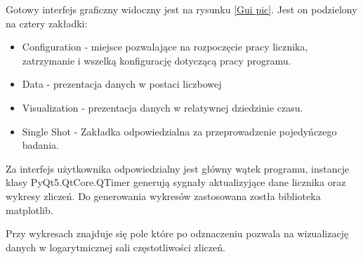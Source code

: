 \documentclass[a4paper,12pt]{article}
\begin{document}
Gotowy interfejs graficzny widoczny jest na rysunku \ref{Gui pic}. Jest on podzielony na cztery zakładki:
\begin{itemize}
        \item Configuration - miejsce pozwalające na rozpoczęcie pracy licznika, zatrzymanie i wszelką konfigurację dotyczącą pracy programu. 
        \item Data - prezentacja danych w postaci liczbowej 
        \item Visualization - prezentacja danych w relatywnej dziedzinie czasu. 
        \item Single Shot - Zakładka odpowiedzialna za przeprowadzenie pojedyńczego badania.
\end{itemize}

Za interfejs użytkownika odpowiedzialny jest główny wątek programu, instancje klasy PyQt5.QtCore.QTimer\cite{doc pyqt} generują sygnały aktualizyjące dane licznika oraz wykresy zliczeń. 
Do generowania wykresów zastosowana zostła biblioteka matplotlib\cite{doc matplotlib}. 

Przy wykresach znajduje się pole które po odznaczeniu pozwala na wizualizację danych w logarytmicznej sali częstotliwości zliczeń.
\end{document}
